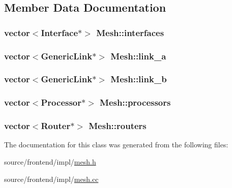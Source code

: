 \subsection{Member Data Documentation}
\hypertarget{classMesh_9ebde4264da1ba6e8f24bd2a24d05ef8}{
\subsubsection[{interfaces}]{\setlength{\rightskip}{0pt plus 5cm}vector$<${\bf Interface}$\ast$$>$ {\bf Mesh::interfaces}}}
\label{classMesh_9ebde4264da1ba6e8f24bd2a24d05ef8}


\hypertarget{classMesh_25aed9e44396cd39a521e647d8e95ed2}{
\subsubsection[{link\_\-a}]{\setlength{\rightskip}{0pt plus 5cm}vector$<${\bf GenericLink}$\ast$$>$ {\bf Mesh::link\_\-a}}}
\label{classMesh_25aed9e44396cd39a521e647d8e95ed2}


\hypertarget{classMesh_8afcc482b97d3820e8249750c8a214c2}{
\subsubsection[{link\_\-b}]{\setlength{\rightskip}{0pt plus 5cm}vector$<${\bf GenericLink}$\ast$$>$ {\bf Mesh::link\_\-b}}}
\label{classMesh_8afcc482b97d3820e8249750c8a214c2}


\hypertarget{classMesh_e3531860febe9e7194b5d44ac1c1b2d8}{
\subsubsection[{processors}]{\setlength{\rightskip}{0pt plus 5cm}vector$<${\bf Processor}$\ast$$>$ {\bf Mesh::processors}}}
\label{classMesh_e3531860febe9e7194b5d44ac1c1b2d8}


\hypertarget{classMesh_da66e4e75f4e50237af30d495248cca2}{
\subsubsection[{routers}]{\setlength{\rightskip}{0pt plus 5cm}vector$<${\bf Router}$\ast$$>$ {\bf Mesh::routers}}}
\label{classMesh_da66e4e75f4e50237af30d495248cca2}




The documentation for this class was generated from the following files:\begin{CompactItemize}
\item 
source/frontend/impl/\hyperlink{mesh_8h}{mesh.h}\item 
source/frontend/impl/\hyperlink{mesh_8cc}{mesh.cc}\end{CompactItemize}
